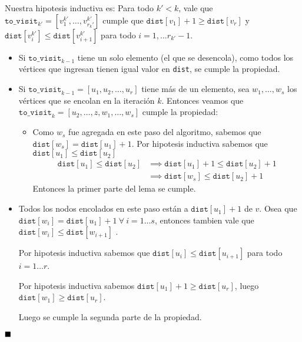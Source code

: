 \begin{demo}
  Nuestra hipotesis inductiva es: Para todo \(k' < k\), vale que \(\texttt{to\_visit}_{k'} = [v_1^{k'},\dots,v_{r_k'}^{k'}]\) cumple que  \(\texttt{dist}[v_1] + 1 \geq \texttt{dist}[v_r]\) y
  \(\texttt{dist}[v^{k'}_i] \leq \texttt{dist}[v^{k'}_{i+1}]\) para todo \(i = 1,\dots r_{k'}-1\).
  \begin{itemize}
    \item Si \(\texttt{to\_visit}_{k-1}\) tiene un solo elemento (el que se desencola), como todos los vértices que ingresan tienen igual valor en \texttt{dist}, se cumple la propiedad.
    \item Si \(\texttt{to\_visit}_{k-1} = [u_1,u_2,\dots,u_r]\) tiene más de un elemento, sea \(w_1,\dots,w_s\) los vértices que se encolan en la iteración \(k\).
          Entonces veamos que \(\texttt{to\_visit}_k = [u_2,\dots,z,w_1,\dots,w_s]\) cumple la propiedad:
          \begin{itemize}
            \item Como \(w_s\) fue agregada en este paso del algoritmo, sabemos que \(\texttt{dist}[w_s] = \texttt{dist}[u_1] + 1\). Por hipotesis inductiva sabemos que \(\texttt{dist}[u_1] \leq \texttt{dist}[u_2]\)
                  \begin{align*}
                    \texttt{dist}[u_1] \leq \texttt{dist}[u_2] & \implies \texttt{dist}[u_1] + 1\leq \texttt{dist}[u_2] + 1 \\ & \implies \texttt{dist}[w_s] \leq \texttt{dist}[u_2] + 1
                  \end{align*}
                  Entonces la primer parte del lema se cumple.
          \end{itemize}
  \end{itemize}
\end{demo}
\begin{demoPart}
  \begin{itemize}
    \begin{itemize}
      \item Todos los nodos encolados en este paso están a \(\texttt{dist}[u_1] + 1\) de \(v\). Osea que \(\texttt{dist}[w_i] = \texttt{dist}[u_1] + 1~\forall~i=1\dots s\), entonces tambien vale que \(\texttt{dist}[w_i] \leq \texttt{dist}[w_{i+1}]\) .

            Por hipotesis inductiva sabemos que \(\texttt{dist}[u_i] \leq \texttt{dist}[u_{i+1}]\) para todo \(i=1\dots r\).

            Por hipotesis inductiva sabemos \(\texttt{dist}[u_1]+1 \geq \texttt{dist}[u_r]\), luego \(\texttt{dist}[w_1] \geq \texttt{dist}[u_r]\).

            Luego se cumple la segunda parte de la propiedad.
    \end{itemize}
  \end{itemize}
  \(\null\hfill\blacksquare\)
\end{demoPart}

